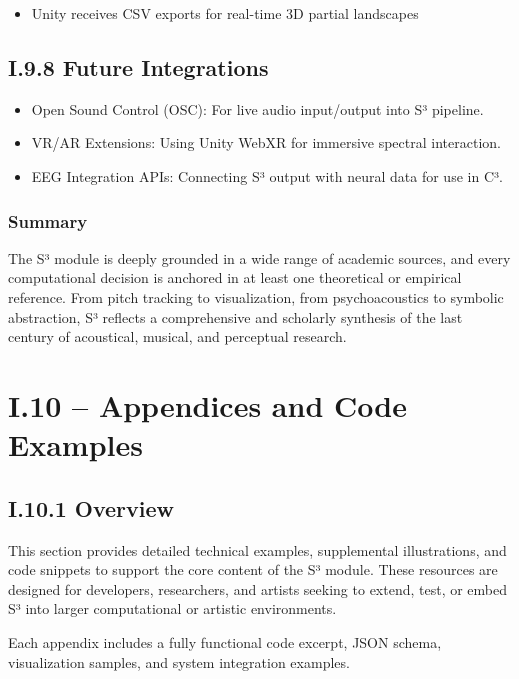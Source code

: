 \begin{itemize}
    \item Unity receives CSV exports for real-time 3D partial landscapes
\end{itemize}

\subsection*{I.9.8 Future Integrations}

\begin{itemize}
    \item Open Sound Control (OSC): For live audio input/output into S³ pipeline.
    \item VR/AR Extensions: Using Unity WebXR for immersive spectral interaction.
    \item EEG Integration APIs: Connecting S³ output with neural data for use in C³.
\end{itemize}

\subsubsection*{Summary}

The S³ module is deeply grounded in a wide range of academic sources, and every computational decision is anchored in at least one theoretical or empirical reference. From pitch tracking to visualization, from psychoacoustics to symbolic abstraction, S³ reflects a comprehensive and scholarly synthesis of the last century of acoustical, musical, and perceptual research.

\section*{I.10 – Appendices and Code Examples}

\subsection*{I.10.1 Overview}

This section provides detailed technical examples, supplemental illustrations, and code snippets to support the core content of the S³ module. These resources are designed for developers, researchers, and artists seeking to extend, test, or embed S³ into larger computational or artistic environments.

Each appendix includes a fully functional code excerpt, JSON schema, visualization samples, and system integration examples.

